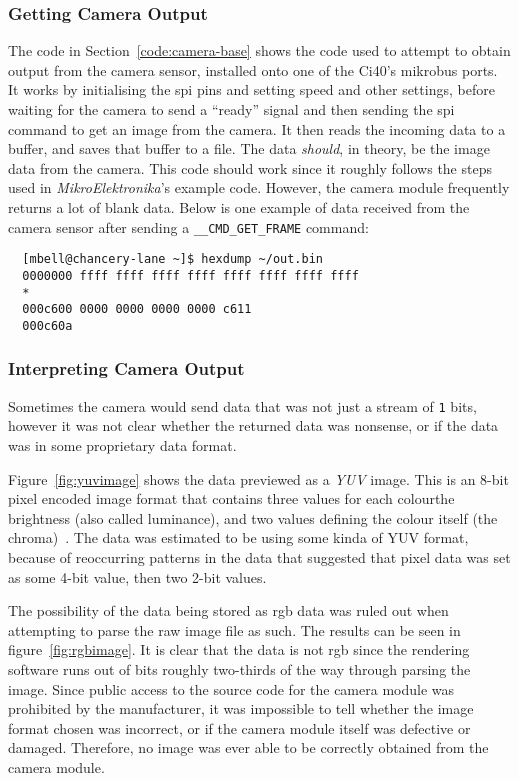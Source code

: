 \subsubsection{Getting Camera Output}
The code in Section~\ref{code:camera-base} shows the code used to attempt to
obtain output from the camera sensor, installed onto one of the Ci40's
\gls{mikrobus} ports. It works by initialising the \acrshort{spi} pins and
setting speed and other settings, before waiting for the camera to send a
``ready'' signal and then sending the \acrshort{spi} command to get an image
from the camera. It then reads the incoming data to a buffer, and saves that
buffer to a file. The data \textit{should}, in theory, be the image data from
the camera. This code should work since it roughly follows the steps used in
\textit{MikroElektronika}'s example code. However, the camera module
frequently returns a lot of blank data. Below is one example of data received
from the camera sensor after sending a \texttt{\_\_CMD\_GET\_FRAME} command:

\begin{verbatim}
  [mbell@chancery-lane ~]$ hexdump ~/out.bin
  0000000 ffff ffff ffff ffff ffff ffff ffff ffff
  *
  000c600 0000 0000 0000 0000 c611               
  000c60a
\end{verbatim}

\subsubsection{Interpreting Camera Output}
Sometimes the camera would send data that was not just a stream of \texttt{1}
bits, however it was not clear whether the returned data was nonsense, or if
the data was in some proprietary data format.

Figure~\ref{fig:yuvimage} shows the data previewed as a \textit{YUV} image.
This is an 8-bit pixel encoded image format that contains three values for
each colour\textemdash{}the brightness (also called luminance), and two
values defining the colour itself (the chroma)~\cite{softpixelyuv}. The data
was estimated to be using some kinda of YUV format, because of reoccurring
patterns in the data that suggested that pixel data was set as some 4-bit
value, then two 2-bit values.

The possibility of the data being stored as \acrfull{rgb} data was ruled out
when attempting to parse the raw image file as such. The results can be seen
in figure~\ref{fig:rgbimage}. It is clear that the data is not \acrshort{rgb}
since the rendering software runs out of bits roughly two-thirds of the way
through parsing the image. Since public access to the source code for the
camera module was prohibited by the manufacturer, it was impossible to tell
whether the image format chosen was incorrect, or if the camera module itself
was defective or damaged. Therefore, no image was ever able to be correctly
obtained from the camera module.

